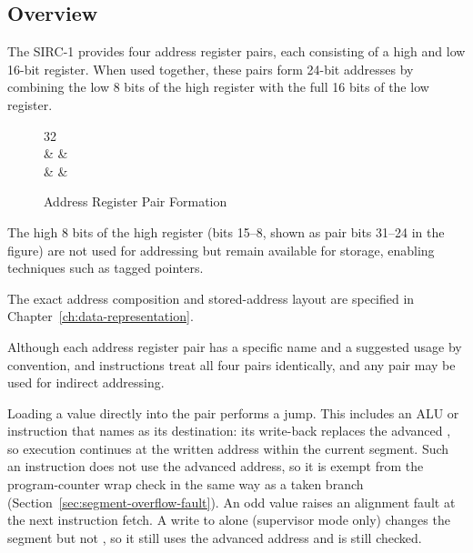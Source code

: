 \subsection{Overview}

The SIRC-1 provides four address register pairs, each consisting of a high and low 16-bit register. When used together,
these pairs form 24-bit addresses by combining the low 8 bits of the high register with the full 16 bits of the low
register.

\begin{figure}[H]
	\centering
	\begin{bytefield}[bitwidth=1.1em,bitheight=3.2\baselineskip]{32}
		 \\
		 &
		 &
		 \\
		 &
		 &
	\end{bytefield}
	\caption{Address Register Pair Formation}
	\label{fig:addr-pair}
\end{figure}

The high 8 bits of the high register (bits 15--8, shown as pair bits 31--24 in the figure) are not used for addressing
but remain available for storage, enabling techniques such as tagged pointers.

The exact address composition and stored-address layout are specified in Chapter~\ref{ch:data-representation}.

Although each address register pair has a specific name and a suggested usage by convention,  and
 instructions treat all four pairs identically, and any pair may be used for indirect addressing.

Loading a value directly into the  pair performs a jump. This includes an ALU or  instruction
that names  as its destination: its write-back replaces the advanced , so execution continues at the
written address within the current segment. Such an instruction does not use the advanced address, so it is exempt from
the program-counter wrap check in the same way as a taken branch (Section~\ref{sec:segment-overflow-fault}). An odd
value raises an alignment fault at the next instruction fetch. A write to  alone (supervisor mode only) changes
the segment but not , so it still uses the advanced address and is still checked.

